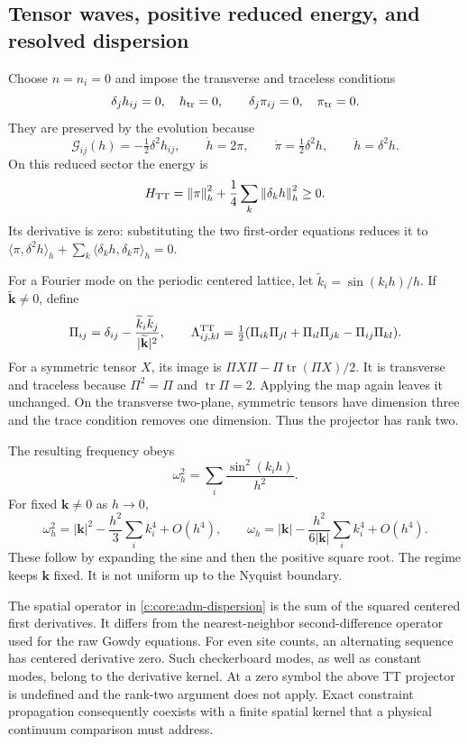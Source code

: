 \subsection{Tensor waves, positive reduced energy, and resolved dispersion}

Choose $n=n_i=0$ and impose the transverse and traceless conditions
\[
 \delta_jh_{ij}=0,\quad h_{\rm tr}=0,
 \qquad\delta_j\pi_{ij}=0,\quad\pi_{\rm tr}=0.
\]
They are preserved by the evolution because
\[
 \mathcal G_{ij}(h)=-\tfrac12\delta^2h_{ij},\qquad
 \dot h=2\pi,\qquad\dot\pi=\tfrac12\delta^2h,
 \qquad\ddot h=\delta^2h.
\]
On this reduced sector the energy is
\[
 H_{\rm TT}=\left\lVert\pi\right\rVert_h^2
 +\frac14\sum_k\left\lVert\delta_kh\right\rVert_h^2\geq0.
\]
Its derivative is zero: substituting the two first-order equations
reduces it to
$\langle\pi,\delta^2h\rangle_h
+\sum_k\langle\delta_kh,\delta_k\pi\rangle_h=0$.

For a Fourier mode on the periodic centered lattice, let
$\widetilde k_i=\sin(k_ih)/h$. If $\widetilde{\mathbf k}\neq0$,
define
\[
 \Pi_{ij}=\delta_{ij}
 -\frac{\widetilde k_i\widetilde k_j}{|\widetilde{\mathbf k}|^2},
 \qquad
 \Lambda^{\rm TT}_{ij,kl}
 =\tfrac12(\Pi_{ik}\Pi_{jl}+\Pi_{il}\Pi_{jk}-\Pi_{ij}\Pi_{kl}).
\]
For a symmetric tensor $X$, its image is
$\Pi X\Pi-\Pi\operatorname{tr}(\Pi X)/2$. It is transverse and
traceless because $\Pi^2=\Pi$ and $\operatorname{tr}\Pi=2$.
Applying the map again leaves it unchanged. On the transverse
two-plane, symmetric tensors have dimension three and the trace
condition removes one dimension. Thus the projector has rank two.

The resulting frequency obeys
\begin{equation}
 \omega_h^2=\sum_i\frac{\sin^2(k_ih)}{h^2}.
 \label{c:core:adm-dispersion}
\end{equation}
For fixed $\mathbf k\neq0$ as $h\to0$,
\[
 \omega_h^2=|\mathbf k|^2-\frac{h^2}{3}\sum_i k_i^4+O(h^4),
 \qquad
 \omega_h=|\mathbf k|
 -\frac{h^2}{6|\mathbf k|}\sum_i k_i^4+O(h^4).
\]
These follow by expanding the sine and then the positive square root.
The regime keeps $\mathbf k$ fixed. It is not uniform up to the
Nyquist boundary.

The spatial operator in \eqref{c:core:adm-dispersion} is the sum of
the squared centered first derivatives. It differs from the
nearest-neighbor second-difference operator used for the raw Gowdy
equations. For even site counts, an alternating sequence has centered
derivative zero. Such checkerboard modes, as well as constant modes,
belong to the derivative kernel. At a zero symbol the above TT
projector is undefined and the rank-two argument does not apply.
Exact constraint propagation consequently coexists with a finite
spatial kernel that a physical continuum comparison must address.




